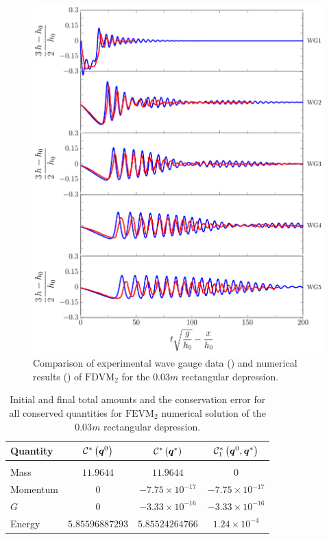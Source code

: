 \begin{figure}
	\centering
	\includegraphics[width=\textwidth]{./chp6/figures/Experiment/Segur/LongWGsFDVM3cm.pdf}
	\caption{Comparison of experimental wave gauge data ({\color{red}\solidrule}) and numerical results ({\color{blue}\solidrule}) of $\text{FDVM}_2$ for the $0.03m$ rectangular depression.}
	\label{fig:Segur3cmFDVM}
\end{figure}  
%
\begin{table}
	\centering
	\begin{tabular}{l  c  c c}
		Quantity& $\mathcal{C}^*\left(\boldsymbol{q}^0\right)$ & $\mathcal{C}^*\left(\boldsymbol{q}^*\right)$ & $\mathcal{C}^*_1\left(\boldsymbol{q}^0,\boldsymbol{q}^*\right)$ \\
		\hline &&& \\
		Mass & $11.9644$ & $11.9644$ & $0$\\
		Momentum & $0$ & $-7.75 \times 10^{-17}$ & $-7.75\times 10^{-17}$\\
		$G$ & $0$ & $-3.33\times 10^{-16}$ & $-3.33\times 10^{-16}$\\
		Energy & $5.85596887293$ & $5.85524264766 $ & $1.24 \times 10^{-4}$ \\
	\end{tabular}
	\caption{Initial and final total amounts and the conservation error for all conserved quantities for $\text{FEVM}_2$ numerical solution of the $0.03m$ rectangular depression.}
	\label{tab:ConservationSegurFEVM3cm}
\end{table} 
